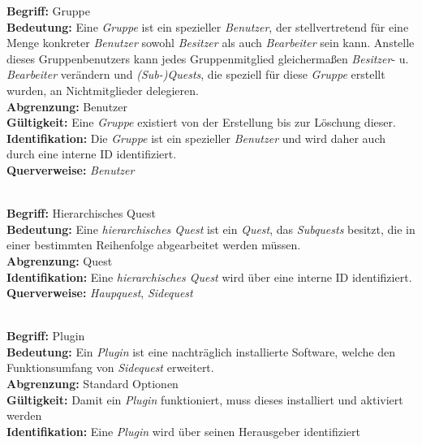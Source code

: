 \documentclass{article}
\begin{document}
\begin{samepage}
\textbf{Begriff:} Gruppe \\
\textbf{Bedeutung:} Eine \textit{Gruppe} ist ein spezieller \textit{Benutzer}, der stellvertretend für eine Menge konkreter \textit{Benutzer} sowohl \textit{Besitzer} als auch \textit{Bearbeiter} sein kann. Anstelle dieses Gruppenbenutzers kann jedes Gruppenmitglied gleichermaßen \textit{Besitzer}- u. \textit{Bearbeiter} verändern und \textit{(Sub-)Quests}, die speziell für diese \textit{Gruppe} erstellt wurden, an Nichtmitglieder delegieren.
 \\
\textbf{Abgrenzung:} Benutzer \\
\textbf{Gültigkeit:} Eine \textit{Gruppe} existiert von der Erstellung bis zur Löschung dieser. \\
\textbf{Identifikation:} Die \textit{Gruppe} ist ein spezieller \textit{Benutzer} und wird daher auch durch eine interne ID identifiziert. \\
\textbf{Querverweise:} \textit{Benutzer} \\ \\
\end{samepage}

\begin{samepage}
\textbf{Begriff:} Hierarchisches Quest \\
\textbf{Bedeutung:} Eine \textit{hierarchisches Quest} ist ein \textit{Quest}, das \textit{Subquests} besitzt, die in einer bestimmten Reihenfolge abgearbeitet werden müssen.  \\
\textbf{Abgrenzung:} Quest \\
\textbf{Identifikation:} Eine \textit{hierarchisches Quest} wird über eine interne ID identifiziert. \\
\textbf{Querverweise:} \textit{Haupquest}, \textit{Sidequest} \\ \\
\end{samepage}

\begin{samepage}
\textbf{Begriff:} Plugin \\
\textbf{Bedeutung:} Ein \textit{Plugin} ist eine nachträglich installierte Software, welche den Funktionsumfang von \textit{Sidequest} erweitert. \\
\textbf{Abgrenzung:} Standard Optionen \\
\textbf{Gültigkeit:} Damit ein \textit{Plugin} funktioniert, muss dieses installiert und aktiviert werden  \\
\textbf{Identifikation:} Eine \textit{Plugin} wird über seinen Herausgeber identifiziert \\
\end{samepage}
\end{document}
